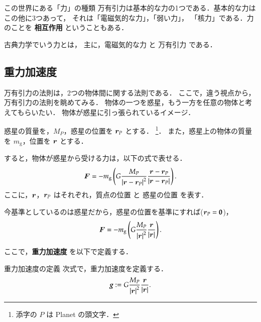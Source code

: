             \begin{memo}{この世界にある「力」の種類}
            万有引力は基本的な力の1つである．基本的な力はこの他に3つあって，
            それは「電磁気的な力」，「弱い力」，
            「核力」である．力のことを \textbf{相互作用} ということもある．

             古典力学でいう力とは， 主に，電磁気的な力 と 万有引力 である．
            \end{memo}

            \subsection{重力加速度}
                万有引力の法則は，2つの物体間に関する法則である．
                ここで，違う視点から，万有引力の法則を眺めてみる．
                物体の一つを惑星，もう一方を任意の物体と考えてもらいたい．
                物体が惑星に引っ張られているイメージ．

                惑星の質量を，$M_{P}$，惑星の位置を $\boldsymbol{r}_{P}$ とする．
                    \footnote{
                        添字の $P$ は Planet の頭文字．
                    }．
                また，惑星上の物体の質量を $m_{\mathrm{g}}$，位置を $\boldsymbol{r}$ とする．

                すると，物体が惑星から受ける力は，以下の式で表せる．
                    \begin{equation*}
                        \boldsymbol{F}
                        =-m_{\mathrm{g}}\left( G\frac{M_{P}}{{\left| \boldsymbol{r}-\boldsymbol{r}_{P} \right|}^{2}}
                        \frac{\boldsymbol{r}-\boldsymbol{r}_{P}}
                        {\left| \boldsymbol{r}-\boldsymbol{r}_{P}\right|}\right).
                    \end{equation*}
                ここに，$\boldsymbol{r}$，$\boldsymbol{r}_{P}$ はそれぞれ，質点の位置 と 惑星の位置 を表す．

                今基準としているのは惑星だから，惑星の位置を基準にすれば($\boldsymbol{r}_{P}=\textbf{0}$)，
                    \begin{equation*}
                        \boldsymbol{F}
                        =-m_{\mathrm{g}}\left( G\frac{M_{P}}{{\left| \boldsymbol{r} \right|}^{2}}
                        \frac{\boldsymbol{r}}
                        {\left| \boldsymbol{r}\right|}\right).
                    \end{equation*}

                ここで，\textbf{重力加速度} を以下で定義する．
                        \begin{myshadebox}{重力加速度の定義}
                            次式で，重力加速度を定義する．
                            \begin{align}\label{eq:GravAccer000}
                                \textit{\textbf{g}} :=
                                G\frac{M_{P}}{{\left| \br \right|}^{2}}
                                \frac{\br}{\left| \br \right|}.
                            \end{align}
                        \end{myshadebox}

